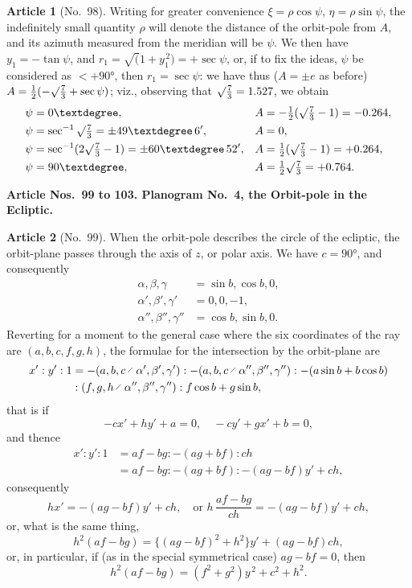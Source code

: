 \documentclass[11pt,a4paper]{article}
\theoremstyle{definition}
\newtheorem{art}{Article}
\begin{document}
\begin{art}[No.~98]
Writing for greater convenience $\xi = \rho\cos\psi$, $\eta = \rho\sin\psi$, the indefinitely small quantity $\rho$ will denote the distance of the orbit-pole from $A$, and its azimuth measured from the meridian will be $\psi$. We then have $y_1 = -\tan\psi$, and $r_1 = \surd(1 + y_1^{\,2}) = +\sec\psi$, or, if to fix the ideas, $\psi$ be considered as $< + 90°$, then $r_1 = \sec\psi$: we have thus ($A = \pm e$ as before) $A = \frac{1}{2}(-\surd\frac{7}{3} + \sec\psi)$; viz., observing that $\surd\frac{7}{3} = 1.527$, we obtain
\begin{align*}
\psi &= 0°, & A &= -\tfrac{1}{2}(\surd\tfrac{7}{3} - 1) = -0.264,\\
\psi &= \sec^{-1}\surd\tfrac{7}{3} = \pm 49°\, 6', & A &= 0,\\
\psi &= \sec^{-1}(2\surd\tfrac{7}{3} - 1) = \pm 60°\, 52', & A &= \tfrac{1}{2}(\surd\tfrac{7}{3} - 1) = +0.264,\\
\psi &= 90°, & A &= \tfrac{1}{2}\surd\tfrac{7}{3} = +0.764.
\end{align*}
\end{art}

\newpage
\noindent\textbf{Article Nos.~99 to 103. Planogram No.~4, the Orbit-pole in the Ecliptic.}

\begin{art}[No.~99]
When the orbit-pole describes the circle of the ecliptic, the orbit-plane passes through the axis of $z$, or polar axis. We have $c = 90°$, and consequently
\begin{align*}
\alpha, \beta, \gamma &= \sin b, \cos b, 0,\\
\alpha', \beta', \gamma' &= 0, 0, -1,\\
\alpha'', \beta'', \gamma'' &= \cos b, \sin b, 0.
\end{align*}
Reverting for a moment to the general case where the six coordinates of the ray are $(a, b, c, f, g, h)$, the formulae for the intersection by the orbit-plane are
\begin{align*}
x' : y' : 1 &= -(a, b, c \,\raisebox{.5ex}{$\scriptscriptstyle\diagup$}\, \alpha', \beta', \gamma') : -(a, b, c \,\raisebox{.5ex}{$\scriptscriptstyle\diagup$}\, \alpha'', \beta'', \gamma'') : -(a\sin b + b\cos b)\\
&: (f, g, h \,\raisebox{.5ex}{$\scriptscriptstyle\diagup$}\, \alpha'', \beta'', \gamma'') : f\cos b + g\sin b,
\end{align*}
that is if
\[
-cx' + hy' + a = 0, \quad -cy' + gx' + b = 0,
\]
and thence
\begin{align*}
x' : y' : 1 &= af - bg : -(ag + bf) : ch\\
&= af - bg : -(ag + bf) : -(ag - bf)y' + ch,
\end{align*}
consequently
\[
hx' = -(ag - bf)y' + ch, \quad \text{or } h\,\frac{af - bg}{ch} = -(ag - bf)y' + ch,
\]
or, what is the same thing,
\[
h^2(af - bg) = \{(ag - bf)^2 + h^2\}y' + (ag - bf)ch,
\]
or, in particular, if (as in the special symmetrical case) $ag - bf = 0$, then
\[
h^2(af - bg) = (f^2 + g^2)y^{\,2} + c^2 + h^2.
\]
\end{art}
\end{document}
